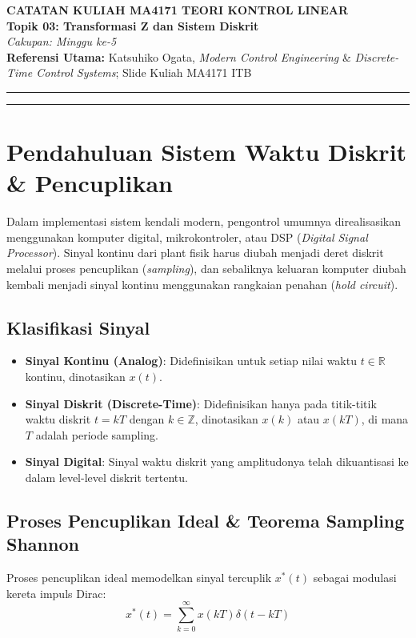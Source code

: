 \documentclass[11pt,a4paper]{article}
\begin{document}
\begin{center}
    {\LARGE \textbf{CATATAN KULIAH MA4171 TEORI KONTROL LINEAR}}\\[6pt]
    {\Large \textbf{Topik 03: Transformasi Z dan Sistem Diskrit}}\\[4pt]
    \textit{Cakupan: Minggu ke-5}\\[2pt]
    \textbf{Referensi Utama:} Katsuhiko Ogata, \textit{Modern Control Engineering} \& \textit{Discrete-Time Control Systems}; Slide Kuliah MA4171 ITB
\end{center}
\vspace{-4pt}
\hrule
\vspace{10pt}

\tableofcontents
\vspace{10pt}
\hrule
\vspace{12pt}

\section{Pendahuluan Sistem Waktu Diskrit \& Pencuplikan}

Dalam implementasi sistem kendali modern, pengontrol umumnya direalisasikan menggunakan komputer digital, mikrokontroler, atau DSP (\textit{Digital Signal Processor}). Sinyal kontinu dari plant fisik harus diubah menjadi deret diskrit melalui proses pencuplikan (\textit{sampling}), dan sebaliknya keluaran komputer diubah kembali menjadi sinyal kontinu menggunakan rangkaian penahan (\textit{hold circuit}).

\subsection{Klasifikasi Sinyal}
\begin{itemize}
    \item \textbf{Sinyal Kontinu (Analog)}: Didefinisikan untuk setiap nilai waktu $t \in \mathbb{R}$ kontinu, dinotasikan $x(t)$.
    \item \textbf{Sinyal Diskrit (Discrete-Time)}: Didefinisikan hanya pada titik-titik waktu diskrit $t = kT$ dengan $k \in \mathbb{Z}$, dinotasikan $x(k)$ atau $x(kT)$, di mana $T$ adalah periode sampling.
    \item \textbf{Sinyal Digital}: Sinyal waktu diskrit yang amplitudonya telah dikuantisasi ke dalam level-level diskrit tertentu.
\end{itemize}

\subsection{Proses Pencuplikan Ideal \& Teorema Sampling Shannon}
Proses pencuplikan ideal memodelkan sinyal tercuplik $x^*(t)$ sebagai modulasi kereta impuls Dirac:
\begin{equation*}
    x^*(t) = \sum_{k=0}^{\infty} x(kT) \delta(t - kT)
\end{equation*}
\end{document}
